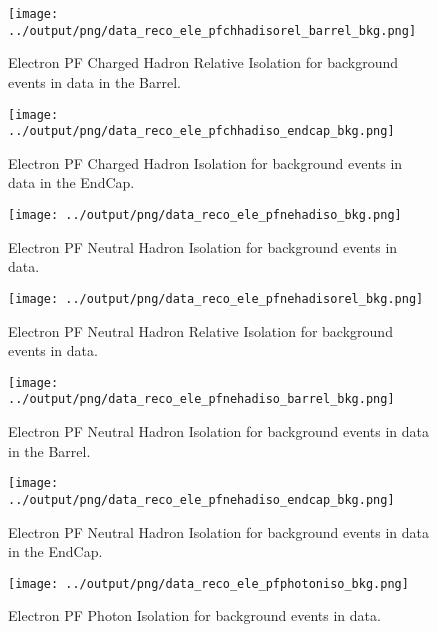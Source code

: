 \documentclass[11pt]{book}
\begin{document}
\begin{figure}[htb]
\centering
\texttt{[image: ../output/png/data\_reco\_ele\_pfchhadisorel\_barrel\_bkg.png]}
\caption{Electron PF Charged Hadron Relative Isolation for background events in data in the Barrel.}
\label{fig:data_ele_pfchhadisorel_barrel_bkg}
\end{figure}

\begin{figure}[htb]
\centering
\texttt{[image: ../output/png/data\_reco\_ele\_pfchhadiso\_endcap\_bkg.png]}
\caption{Electron PF Charged Hadron Isolation for background events in data in the EndCap.}
\label{fig:data_ele_pfchhadiso_endcap_bkg}
\end{figure}

\begin{figure}[htb]
\centering
\texttt{[image: ../output/png/data\_reco\_ele\_pfnehadiso\_bkg.png]}
\caption{Electron PF Neutral Hadron Isolation for background events in data.}
\label{fig:data_ele_pfnehadiso_bkg}
\end{figure}

\begin{figure}[htb]
\centering
\texttt{[image: ../output/png/data\_reco\_ele\_pfnehadisorel\_bkg.png]}
\caption{Electron PF Neutral Hadron Relative Isolation for background events in data.}
\label{fig:data_ele_pfnehadisorel_bkg}
\end{figure}

\begin{figure}[htb]
\centering
\texttt{[image: ../output/png/data\_reco\_ele\_pfnehadiso\_barrel\_bkg.png]}
\caption{Electron PF Neutral Hadron Isolation for background events in data in the Barrel.}
\label{fig:data_ele_pfnehadiso_barrel_bkg}
\end{figure}

\begin{figure}[htb]
\centering
\texttt{[image: ../output/png/data\_reco\_ele\_pfnehadiso\_endcap\_bkg.png]}
\caption{Electron PF Neutral Hadron Isolation for background events in data in the EndCap.}
\label{fig:data_ele_pfnehadiso_endcap_bkg}
\end{figure}

\begin{figure}[htb]
\centering
\texttt{[image: ../output/png/data\_reco\_ele\_pfphotoniso\_bkg.png]}
\caption{Electron PF Photon Isolation for background events in data.}
\label{fig:data_ele_pfphotoniso_bkg}
\end{figure}
\end{document}
